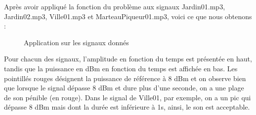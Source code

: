 Après avoir appliqué la fonction du problème aux signaux Jardin01.mp3, Jardin02.mp3, Ville01.mp3 et MarteauPiqueur01.mp3, voici ce que nous obtenons :

\begin{figure}[htb]
\caption{Application sur les signaux donnés}
\label{Fig.main}
\end{figure}

\newline
Pour chacun des signaux, l’amplitude en fonction du temps est présentée en haut, tandis que la puissance en dBm en fonction du temps est affichée en bas. Les pointillés rouges désignent la puissance de référence à 8 dBm et on observe bien que lorsque le signal dépasse 8 dBm et dure plus d’une seconde, on a une plage de son pénible (en rouge). Dans le signal de Ville01, par exemple, on a un pic qui dépasse 8 dBm mais dont la durée est inférieure à 1s, ainsi, le son est acceptable. 